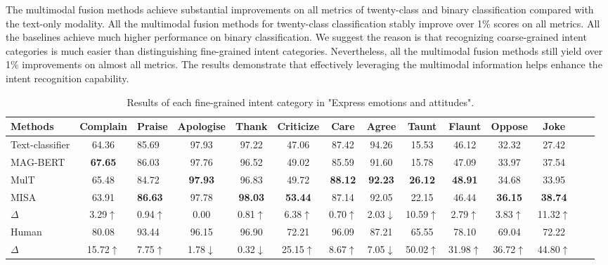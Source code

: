 \documentclass[sigconf,camera-ready]{acmart}
\begin{document}
The multimodal fusion methods achieve substantial improvements on all metrics of twenty-class and binary classification compared with the text-only modality. All the multimodal fusion methods for twenty-class classification stably improve over 1\% scores on all metrics. All the baselines achieve much higher performance on binary classification. We suggest the reason is that recognizing coarse-grained intent categories is much easier than distinguishing fine-grained intent categories. Nevertheless, all the multimodal fusion methods still yield over 1\% improvements on almost all metrics. The results demonstrate that effectively leveraging the multimodal information helps enhance the intent recognition capability. 
\begin{table*}[t!]\small
	\caption{\label{emotion_results_each_class} Results of each fine-grained intent category in "Express emotions and attitudes".}
	\renewcommand\tabcolsep{3pt} 
	\centering
	
	\begin{tabular*}{\textwidth}{l|c@{\extracolsep{\fill}}lccccccccccc} 
		\toprule
Methods &Complain& Praise & Apologise & Thank & Criticize  & Care & Agree & Taunt & Flaunt & Oppose & Joke   \\ 
		\midrule
		\multicolumn{1}{l|}{Text-classifier}  & 64.36 & 85.69 & 97.93 & 97.22 & 47.06 & 87.42 & 94.26 & 15.53 & 46.12 & 32.32 & 27.42 \\
		\midrule
		\multicolumn{1}{l|}{MAG-BERT}  & \textbf{67.65} & 86.03 & 97.76 & 96.52 & 49.02 & 85.59 & 91.60 & 15.78 & 47.09 & 33.97 & 37.54\\
		\multicolumn{1}{l|}{MulT} & 65.48 & 84.72 & \textbf{97.93} & 96.83 & 49.72 & \textbf{88.12} & \textbf{92.23} & \textbf{26.12} & \textbf{48.91} & 34.68 & 33.95 \\
		\multicolumn{1}{l|}{MISA} & 63.91 & \textbf{86.63} & 97.78 & \textbf{98.03} & \textbf{53.44} & 87.14 & 92.05 & 22.15 & 46.44 & \textbf{36.15} & \textbf{38.74}\\
		\multicolumn{1}{l|}{$\Delta$} &3.29$\uparrow$ & 0.94$\uparrow$ & 0.00 & 0.81$\uparrow$ & 6.38$\uparrow$ & 0.70$\uparrow$ & 2.03$\downarrow$ & 10.59$\uparrow$ & 2.79$\uparrow$ & 3.83$\uparrow$ & 11.32$\uparrow$ \\
        \midrule
		\multicolumn{1}{l|}{Human}  & 80.08 & 93.44 & 96.15 & 96.90 & 72.21 & 96.09 & 87.21 & 65.55 & 78.10 & 69.04 & 72.22 \\
		\multicolumn{1}{l|}{$\Delta$}  & 15.72$\uparrow$ & 7.75$\uparrow$ & 1.78$\downarrow$ & 0.32$\downarrow$ & 25.15$\uparrow$ & 8.67$\uparrow$ & 7.05$\downarrow$ & 50.02$\uparrow$ & 31.98$\uparrow$ & 36.72$\uparrow$ & 44.80$\uparrow$ \\
		\midrule
	\end{tabular*}
\end{table*}
\end{document}

